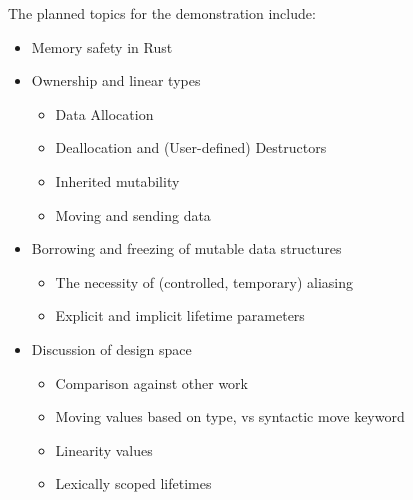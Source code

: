 \documentclass{acm_proc_article-sp}
\begin{document}
The planned topics for the demonstration include:
\begin{itemize}
\item Memory safety in Rust
\item Ownership and linear types
\begin{itemize}
\item Data Allocation
\item Deallocation and (User-defined) Destructors
\item Inherited mutability
\item Moving and sending data
\end{itemize}
\item Borrowing and freezing of mutable data structures
\begin{itemize}
\item The necessity of (controlled, temporary) aliasing
\item Explicit and implicit lifetime parameters
\end{itemize}
\item Discussion of design space
\begin{itemize}
\item Comparison against other work
\item Moving values based on type, vs syntactic move keyword
\item Linearity values
\item Lexically scoped lifetimes
\end{itemize}
\end{itemize}
\end{document}
